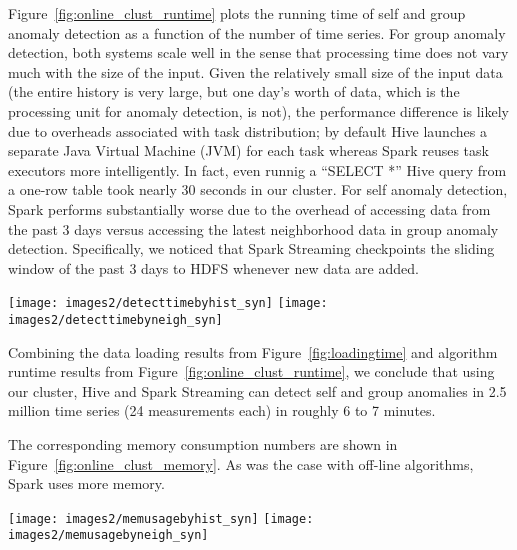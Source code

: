 \documentclass[prodmode,acmtods]{acmsmall}
\begin{document}
Figure~\ref{fig:online_clust_runtime} plots the running time of self and group anomaly detection as a function of the number of time series.  For group anomaly detection, both systems scale well in the sense that processing time does not vary much with the size of the input.  Given the relatively small size of the input data (the entire history is very large, but one day's worth of data, which is the processing unit for anomaly detection, is not), the performance difference is likely due to overheads associated with task distribution; by default Hive launches a separate Java Virtual Machine (JVM) for each task whereas Spark reuses task executors more intelligently.  In fact, even runnig a ``SELECT *'' Hive query from a one-row table took nearly 30 seconds in our cluster.
For self anomaly detection, Spark performs substantially worse due to the overhead of accessing data from the past 3 days versus accessing the latest neighborhood data in group anomaly detection.  Specifically, we noticed that Spark Streaming checkpoints the sliding window of the past 3 days to HDFS whenever new data are added.

\begin{figure*}[t]
\centering
\texttt{[image: images2/detecttimebyhist\_syn]}
\texttt{[image: images2/detecttimebyneigh\_syn]}
\caption{Execution times in Spark and Hive for self (left) and group (right) anomalies.}
\label{fig:online_clust_runtime}
\end{figure*}

Combining the data loading results from Figure~\ref{fig:loadingtime} and algorithm runtime results from Figure~\ref{fig:online_clust_runtime}, we conclude that using our cluster, Hive and Spark Streaming can detect self and group anomalies in 2.5 million time series (24 measurements each) in roughly 6 to 7 minutes.

The corresponding memory consumption numbers are shown in Figure~\ref{fig:online_clust_memory}.  As was the case with off-line algorithms, Spark uses more memory.

\begin{figure*}[t]
\centering
\texttt{[image: images2/memusagebyhist\_syn]}
\texttt{[image: images2/memusagebyneigh\_syn]}
\caption{Memory consumption of Spark and Hive for self (left) and group (right) anomalies.}
\label{fig:online_clust_memory}
\end{figure*}
\end{document}
